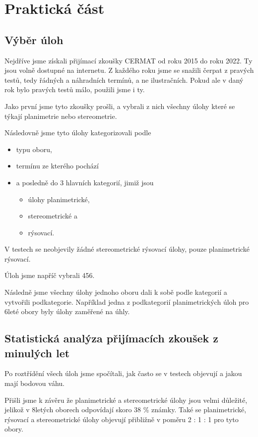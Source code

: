 \chapter{Praktická část}

\section{Výběr úloh}

Nejdříve jsme získali přijímací zkoušky CERMAT od roku 2015 do roku 2022. Ty jsou volně dostupné na internetu. Z každého roku jsme se snažili čerpat z pravých testů, tedy řádných a náhradních termínů, a ne ilustračních. Pokud ale v daný rok bylo pravých testů málo, použili jsme i ty.

Jako první jsme tyto zkoušky prošli, a vybrali z nich všechny úlohy které se týkají planimetrie nebo stereometrie.

Následovně jsme tyto úlohy kategorizovali podle 
\begin{itemize}
	\item typu oboru,
	\item termínu ze kterého pochází
	\item a posledně do 3 hlavních kategorií, jimiž jsou
	\begin{itemize}
		\item úlohy planimetrické,
		\item stereometrické a
		\item rýsovací.
	\end{itemize}
\end{itemize}

V testech se neobjevily žádné stereometrické rýsovací úlohy, pouze planimetrické rýsovací.

Úloh jsme napříč vybrali 456.

Následně jsme všechny úlohy jednoho oboru dali k sobě podle kategorií a vytvořili podkategorie. Například jedna z podkategorií planimetrických úloh pro 6leté obory byly úlohy zaměřené na úhly.

\section{Statistická analýza přijímacích zkoušek z minulých let}

Po roztřídění všech úloh jsme spočítali, jak často se v testech objevují a jakou mají bodovou váhu.

Přišli jsme k závěru že planimetrické a stereometrické úlohy jsou velmi důležité, jelikož v 8letých oborech odpovídají skoro 38 \% známky. Také se planimetrické, rýsovací a stereometrické úlohy objevují přibližně v poměru 2 : 1 : 1 pro tyto obory.

